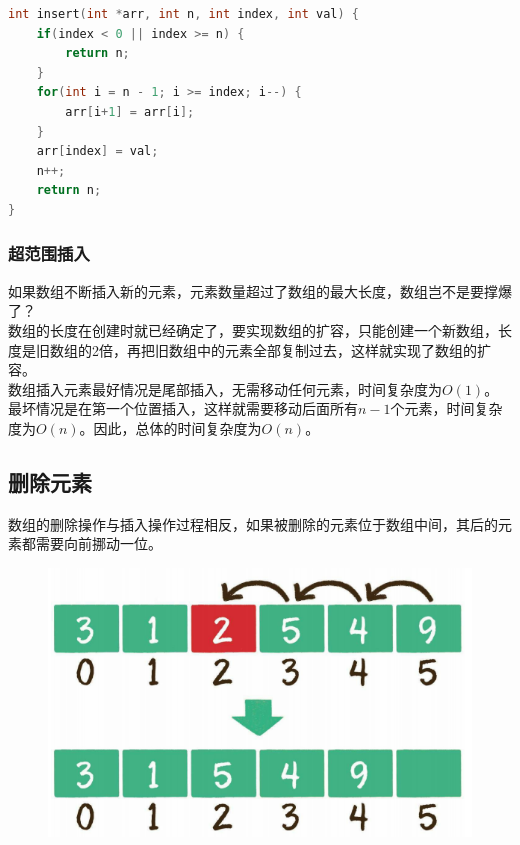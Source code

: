 
\begin{lstlisting}[language=C]
int insert(int *arr, int n, int index, int val) {
    if(index < 0 || index >= n) {
        return n;
    }
    for(int i = n - 1; i >= index; i--) {
        arr[i+1] = arr[i];
    }
    arr[index] = val;
    n++;
    return n;
}
\end{lstlisting}

\subsubsection{超范围插入}

如果数组不断插入新的元素，元素数量超过了数组的最大长度，数组岂不是要撑爆了？ \\

数组的长度在创建时就已经确定了，要实现数组的扩容，只能创建一个新数组，长度是旧数组的2倍，再把旧数组中的元素全部复制过去，这样就实现了数组的扩容。 \\

数组插入元素最好情况是尾部插入，无需移动任何元素，时间复杂度为$ O(1) $。最坏情况是在第一个位置插入，这样就需要移动后面所有$ n - 1 $个元素，时间复杂度为$ O(n) $。因此，总体的时间复杂度为$ O(n) $。

\subsection{删除元素}

数组的删除操作与插入操作过程相反，如果被删除的元素位于数组中间，其后的元素都需要向前挪动一位。

\begin{figure}[H]
    \centering
    \includegraphics[scale=0.8]{img/C2/2-3/3.png}
\end{figure}

